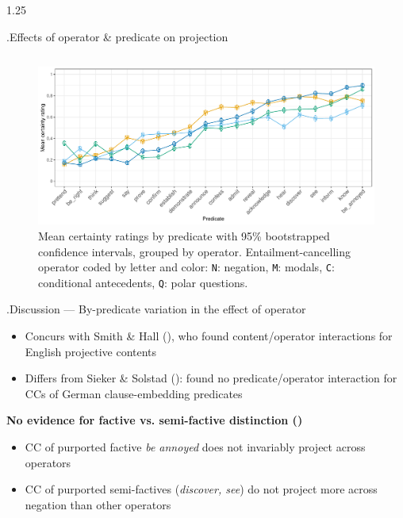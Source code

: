 \documentclass[final, table, cmyk]{beamer}
\newlength{\colwidth}
\newlength{\vboxsep}
\newlength{\mboxpreadjust}
\begin{document}
\begin{frame}[t]
\begin{columns}[t]
\begin{column}{1.25\colwidth}
\begin{normalbox}{\phantom.\hfill Effects of operator \& predicate on projection}
\begin{tabular}{p{.70\linewidth} p{.3\linewidth}}
				\end{tabular}
				\vspace{-1.24\baselineskip}
				\begin{figure}[h]
					\centering
					\includegraphics[width=\linewidth]{projective-pred-op.pdf}
					\vspace{-1.7\baselineskip}
					\caption{Mean certainty ratings by predicate with 95\% bootstrapped confidence intervals, grouped by operator. Entailment-cancelling operator coded by letter and color:  \textcolor{neg}{\texttt{N}: negation}, \textcolor{modal}{\texttt{M}: modals}, \textcolor{cond}{\texttt{C}: conditional antecedents}, \textcolor{question}{\texttt{Q}: polar questions}.
					}
					\label{fig:figure3}
				\end{figure}
				\vspace{-.8\baselineskip}
			\end{normalbox}
			
			\vspace{\vboxsep}
			\begin{normalbox}{\phantom.\hfill Discussion --- By-predicate variation in the effect of operator}
				\begin{itemize}
					\item Concurs with Smith \& Hall (\citeyear{smith_relationship_2014}), who found content/operator interactions for English projective contents
					\item Differs from Sieker \& Solstad (\citeyear{sieker_projective_2022}): found no predicate/operator interaction for CCs of German clause-embedding predicates
				\end{itemize}
				
				\textbf{No evidence for factive vs. semi-factive distinction (\citealt{karttunen_observations_1971})}
				\vspace{\mboxpreadjust}
				\begin{itemize}
					\item CC of purported factive \textit{be annoyed} does not invariably project across operators
					\item CC of purported semi-factives (\textit{discover, see}) do not project more across negation than other operators
				\end{itemize}


\end{normalbox}
\end{column}
\end{columns}
\end{frame}
\end{document}

